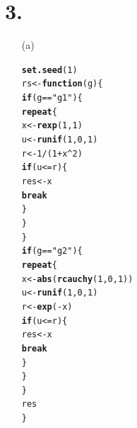 \documentclass{article}\usepackage[]{graphicx}\usepackage[]{color}
\makeatletter
\newcommand{\hlnum}[1]{\textcolor[rgb]{0.686,0.059,0.569}{#1}}%
\newcommand{\hlstr}[1]{\textcolor[rgb]{0.192,0.494,0.8}{#1}}%
\newcommand{\hlopt}[1]{\textcolor[rgb]{0,0,0}{#1}}%
\newcommand{\hlstd}[1]{\textcolor[rgb]{0.345,0.345,0.345}{#1}}%
\newcommand{\hlkwa}[1]{\textcolor[rgb]{0.161,0.373,0.58}{\textbf{#1}}}%
\newcommand{\hlkwb}[1]{\textcolor[rgb]{0.69,0.353,0.396}{#1}}%
\newcommand{\hlkwc}[1]{\textcolor[rgb]{0.333,0.667,0.333}{#1}}%
\newcommand{\hlkwd}[1]{\textcolor[rgb]{0.737,0.353,0.396}{\textbf{#1}}}%
\newenvironment{kframe}{%
 \def\at@end@of@kframe{}%
 \ifinner\ifhmode%
  \def\at@end@of@kframe{\end{minipage}}%
  \begin{minipage}{\columnwidth}%
 \fi\fi%
 \def\FrameCommand##1{\hskip\@totalleftmargin \hskip-\fboxsep
 \colorbox{shadecolor}{##1}\hskip-\fboxsep
     \hskip-\linewidth \hskip-\@totalleftmargin \hskip\columnwidth}%
 \MakeFramed {\advance\hsize-\width
   \@totalleftmargin\z@ \linewidth\hsize
   \@setminipage}}%
 {\par\unskip\endMakeFramed%
 \at@end@of@kframe}
\newenvironment{knitrout}{}{} %
\makeatother
\begin{document}
\section*{3.}
\begin{itemize}
\item[(a)]
\begin{knitrout}
\color{fgcolor}\begin{kframe}
\begin{alltt}
\hlkwd{set.seed}\hlstd{(}\hlnum{1}\hlstd{)}
\hlstd{rs} \hlkwb{<-} \hlkwa{function}\hlstd{(}\hlkwc{g}\hlstd{)\{}
  \hlkwa{if} \hlstd{(g}\hlopt{==}\hlstr{"g1"}\hlstd{)\{}
    \hlkwa{repeat}\hlstd{\{}
      \hlstd{x} \hlkwb{<-} \hlkwd{rexp}\hlstd{(}\hlnum{1}\hlstd{,}\hlnum{1}\hlstd{)}
      \hlstd{u} \hlkwb{<-} \hlkwd{runif}\hlstd{(}\hlnum{1}\hlstd{,}\hlnum{0}\hlstd{,}\hlnum{1}\hlstd{)}
      \hlstd{r} \hlkwb{<-} \hlnum{1}\hlopt{/}\hlstd{(}\hlnum{1}\hlopt{+}\hlstd{x}\hlopt{^}\hlnum{2}\hlstd{)}
      \hlkwa{if} \hlstd{(u} \hlopt{<=} \hlstd{r)\{}
        \hlstd{res} \hlkwb{<-} \hlstd{x}
        \hlkwa{break}
      \hlstd{\}}
  \hlstd{\}}
  \hlstd{\}}
  \hlkwa{if} \hlstd{(g}\hlopt{==}\hlstr{"g2"}\hlstd{)\{}
    \hlkwa{repeat}\hlstd{\{}
      \hlstd{x} \hlkwb{<-} \hlkwd{abs}\hlstd{(}\hlkwd{rcauchy}\hlstd{(}\hlnum{1}\hlstd{,}\hlnum{0}\hlstd{,}\hlnum{1}\hlstd{))}
      \hlstd{u} \hlkwb{<-} \hlkwd{runif}\hlstd{(}\hlnum{1}\hlstd{,}\hlnum{0}\hlstd{,}\hlnum{1}\hlstd{)}
      \hlstd{r} \hlkwb{<-} \hlkwd{exp}\hlstd{(}\hlopt{-}\hlstd{x)}
      \hlkwa{if} \hlstd{(u} \hlopt{<=} \hlstd{r)\{}
        \hlstd{res} \hlkwb{<-} \hlstd{x}
        \hlkwa{break}
      \hlstd{\}}
    \hlstd{\}}
  \hlstd{\}}
  \hlstd{res}
\hlstd{\}}


\end{alltt}
\end{kframe}
\end{knitrout}
\end{itemize}
\end{document}
